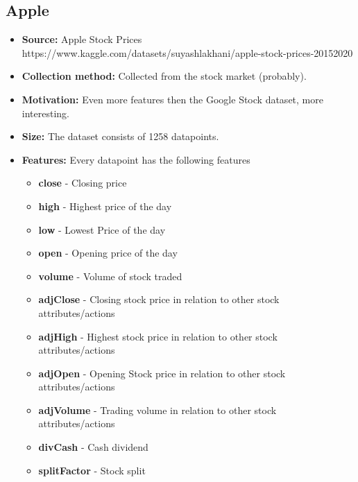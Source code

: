\subsection{Apple}
\begin{itemize}
	\item \textbf{Source:} Apple Stock Prices \\ https://www.kaggle.com/datasets/suyashlakhani/apple-stock-prices-20152020
	\item \textbf{Collection method:} Collected from the stock market (probably).
	\item \textbf{Motivation:} Even more features then the Google Stock dataset, more interesting.
	\item \textbf{Size:} The dataset consists of 1258 datapoints.
	\item \textbf{Features:} Every datapoint has the following features
	      \begin{itemize}
		      \item \textbf{close} - Closing price
		      \item \textbf{high} - Highest price of the day
		      \item \textbf{low} - Lowest Price of the day
		      \item \textbf{open} - Opening price of the day
		      \item \textbf{volume} - Volume of stock traded
		      \item \textbf{adjClose} - Closing stock price in relation to other stock attributes/actions
		      \item \textbf{adjHigh} - Highest stock price in relation to other stock attributes/actions
		      \item \textbf{adjOpen} - Opening Stock price in relation to other stock attributes/actions
		      \item \textbf{adjVolume} - Trading volume in relation to other stock attributes/actions
		      \item \textbf{divCash} - Cash dividend
		      \item \textbf{splitFactor} - Stock split
	      \end{itemize}
\end{itemize}
